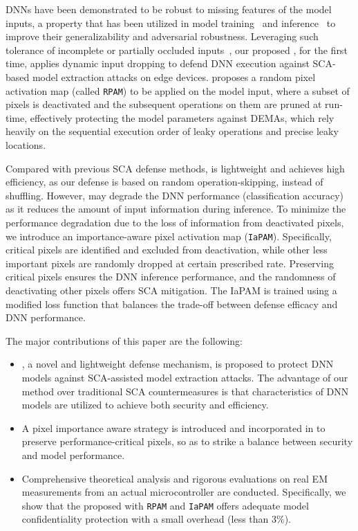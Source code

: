 DNNs have been demonstrated to be robust to missing features of the model inputs, a property that has been utilized in model training~\cite{he2022masked} and inference~\cite{gao2017deepcloak} to improve their generalizability and adversarial robustness.
Leveraging such tolerance of incomplete or partially occluded inputs~\cite{zhang2013occlusion}, our proposed \method, for the first time, applies dynamic input dropping to defend DNN execution against SCA-based model extraction attacks on edge devices.
\method proposes a random pixel activation map (called \texttt{RPAM}) to be applied on the model input, where a subset of pixels is deactivated and the subsequent operations on them are pruned at run-time, effectively protecting the model parameters against DEMAs, which rely heavily on the sequential execution order of leaky operations and precise leaky locations. 

Compared with previous SCA defense methods, \method is lightweight and achieves high efficiency, as our defense is based on random operation-skipping, instead of shuffling. %
However, \method may degrade the DNN performance (classification accuracy) as it reduces the amount of input information during inference.
To minimize the performance degradation due to the loss of information from deactivated pixels, we introduce an importance-aware pixel activation map (\texttt{IaPAM}). 
Specifically, critical pixels are identified and excluded from deactivation, while other less important pixels are randomly dropped at certain prescribed rate. 
Preserving critical pixels ensures the DNN inference performance, and the randomness of deactivating other pixels offers SCA mitigation. 
The IaPAM is trained using a modified loss function that balances the trade-off between defense efficacy and DNN performance.

The major contributions of this paper are the following:
\begin{itemize}
    \item \method, a novel and lightweight defense mechanism, is proposed to protect DNN models against SCA-assisted model extraction attacks. The advantage of our method over traditional SCA countermeasures is that characteristics of DNN models are utilized to achieve both security and efficiency.
    \item A pixel importance aware strategy is introduced and incorporated in \method to preserve performance-critical pixels, so as to strike a balance between security and model performance.
    \item Comprehensive theoretical analysis and rigorous evaluations on real EM measurements from an actual microcontroller are conducted. 
    Specifically, we show that the proposed \method with \texttt{RPAM} and \texttt{IaPAM} offers adequate model confidentiality protection with a small overhead (less than $3\%$).
\end{itemize}


